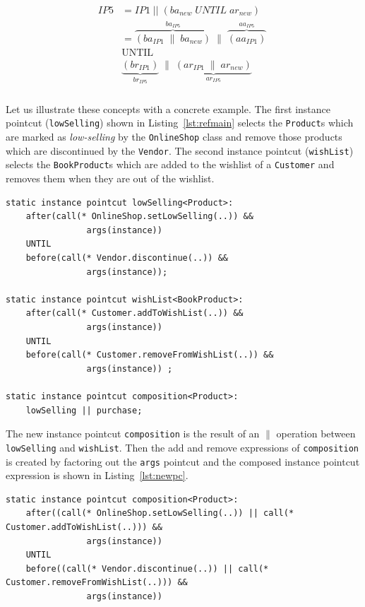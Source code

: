 \documentclass{acm_proc_article-sp}
\begin{document}
\begin{align}
\begin{split}
IP5 & = IP1\;||\;(ba_{new}\;UNTIL\;ar_{new}) \\
   & = \overbrace{\left( ba_{IP1}\;\|\;ba_{new}\right)}^{ba_{IP5}}\;\|\;\overbrace{\left( aa_{IP1} \right)}^{aa_{IP5}}\;\\
&\textrm{UNTIL} \\
&\underbrace{\left( br_{IP1}\right)}_{br_{IP5}}\;\|\;\underbrace{\left( ar_{IP1}\;\|\;ar_{new} \right)}_{ar_{IP5}}\;\\  
\end{split}
\end{align}

Let us illustrate these concepts with a concrete example. The first instance pointcut  (\lstinline{lowSelling})  shown in Listing~\ref{lst:refmain} selects the \lstinline{Product}s which are marked as \emph{low-selling} by the \lstinline{OnlineShop} class and remove those products which are discontinued by the \lstinline{Vendor}. The second instance pointcut (\lstinline{wishList})  selects the \lstinline{BookProduct}s which are added to the wishlist of a \lstinline{Customer} and removes them when they are out of the wishlist.

\begin{lstlisting}[float=h!, caption={Two instance pointcuts composed to obtain a new one}, label={lst:refmain}]
static instance pointcut lowSelling<Product>: 
	after(call(* OnlineShop.setLowSelling(..)) &&
				args(instance)) 
	UNTIL 
	before(call(* Vendor.discontinue(..)) &&
				args(instance));
				
static instance pointcut wishList<BookProduct>: 
	after(call(* Customer.addToWishList(..)) &&
				args(instance)) 
	UNTIL 
	before(call(* Customer.removeFromWishList(..)) &&
				args(instance)) ;
				
static instance pointcut composition<Product>: 
	lowSelling || purchase;
\end{lstlisting}

The new instance pointcut \lstinline{composition} is the result of an $\|$ operation between \lstinline{lowSelling} and \lstinline{wishList}. Then the add and remove expressions of \lstinline{composition} is created by factoring out the \lstinline{args} pointcut and the composed instance pointcut expression is shown in Listing~\ref{lst:newpc}. 

\begin{lstlisting}[float=h!, caption={The new instance pointcut after composition}, label={lst:newpc}]
static instance pointcut composition<Product>: 
	after((call(* OnlineShop.setLowSelling(..)) || call(* Customer.addToWishList(..))) && 
				args(instance)) 
	UNTIL 
	before((call(* Vendor.discontinue(..)) || call(* Customer.removeFromWishList(..))) && 
				args(instance))
\end{lstlisting}
\end{document}
